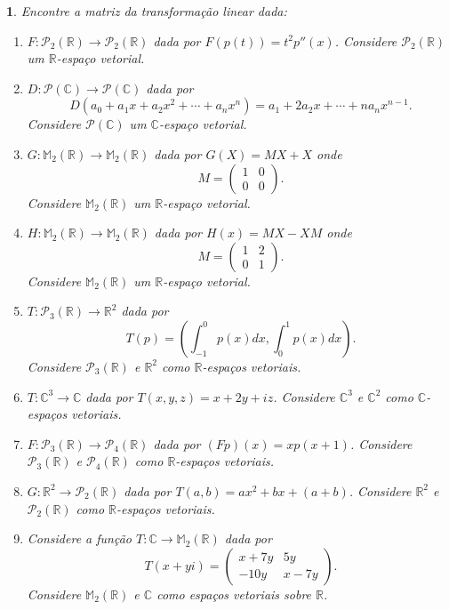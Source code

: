 \documentclass[12pt]{exam}
\newtheorem{exercicio}{}
\newcommand{\real}{\mathbb{R}}
\newcommand{\complex}{\mathbb{C}}
\newcommand{\cp}[1]{\mathbb{#1}}
\begin{document}
\begin{exercicio}
  Encontre a matriz da transformação linear dada:
  \begin{enumerate}[label=({\alph*})]
    \item $F : \mathcal{P}_2(\real) \to \mathcal{P}_2(\real)$ dada por $F(p(t)) = t^2p''(x)$. Considere $\mathcal{P}_2(\real)$ um $\real$-espa\c{c}o vetorial.
    \item $D : \mathcal{P}(\complex) \to \mathcal{P}(\complex)$ dada por
    \[
      D(a_0 + a_1x + a_2x^2 + \cdots + a_nx^n) = a_1 + 2a_2x + \cdots + na_nx^{n - 1}.
    \]
    Considere $\mathcal{P}(\complex)$ um $\complex$-espa\c{c}o vetorial.
    
    \item $G : \cp{M}_2(\real) \to \cp{M}_2(\real)$ dada por $G(X) = MX + X$ onde
    \[
      M = \begin{pmatrix}
        1 & 0\\
        0 & 0
      \end{pmatrix}.
    \]
    Considere $\cp{M}_2(\real)$ um $\real$-espa\c{c}o vetorial.
    \item $H : \cp{M}_2(\real) \to \cp{M}_2(\real)$ dada por $H(x) = MX - XM$ onde
    \[
      M = \begin{pmatrix}
        1 & 2\\
        0 & 1
      \end{pmatrix}.
    \]
    Considere $\cp{M}_2(\real)$ um $\real$-espa\c{c}o vetorial.
    \item $T : \mathcal{P}_3(\real) \to \real^2$ dada por
    \[
      T(p) = \left(\int_{-1}^0p(x)dx, \int_0^1p(x)dx\right).
    \]
    Considere $\mathcal{P}_3(\real)$ e $\real^2$ como $\real$-espa\c{c}os vetoriais.
    \item $T : \complex^3 \to \complex$ dada por $T(x,y,z) = x + 2y + iz$. Considere $\complex^3$ e $\complex^2$ como $\complex$-espa\c{c}os vetoriais.
    \item $F : \mathcal{P}_3(\real) \to \mathcal{P}_4(\real)$ dada por $(Fp)(x) = xp(x + 1)$. Considere $\mathcal{P}_3(\real)$ e $\mathcal{P}_4(\real)$ como $\real$-espa\c{c}os vetoriais.
    \item $G : \real^2 \to \mathcal{P}_2(\real)$ dada por $T(a,b) = ax^2 + bx + (a + b)$. Considere $\real^2$ e $\mathcal{P}_2(\real)$ como $\real$-espa\c{c}os vetoriais.

    \item Considere a fun\c{c}\~ao $T : \complex \to \cp{M}_2(\real)$ dada por
  \[
    T(x + yi) = \begin{pmatrix}
      x + 7y & 5y\\
      -10y & x - 7y
    \end{pmatrix}.
  \]
  Considere $\cp{M}_2(\real)$ e $\complex$ como espa\c{c}os vetoriais sobre $\real$.
   \end{enumerate}
\end{exercicio}
\end{document}
